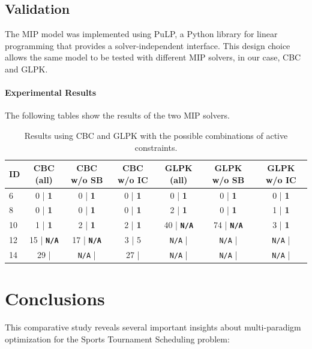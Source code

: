 \documentclass[11pt]{article}
\begin{document}
\subsection{Validation}

The MIP model was implemented using PuLP, a Python library for linear programming that provides a solver-independent interface. This design choice allows the same model to be tested with different MIP solvers, in our case, CBC and GLPK.

\paragraph{Experimental Results} The following tables show the results of the two MIP solvers.

\begin{table}[H]
\centering
\small
\label{tab:mip}
\begin{tabular}{@{}lcccccc@{}}
\toprule
ID & CBC (all) & CBC w/o SB & CBC w/o IC & GLPK (all) & GLPK w/o SB & GLPK w/o IC \\
\midrule
6 & 0 | \textbf{1} & 0 | \textbf{1} & 0 | \textbf{1} & 0 | \textbf{1} & 0 | \textbf{1} & 0 | \textbf{1}\\
8 & 0 | \textbf{1} & 0 | \textbf{1} & 0 | \textbf{1} & 2 | \textbf{1} & 0 | \textbf{1} & 1 | \textbf{1}\\
10 & 1 | \textbf{1} & 2 | \textbf{1} & 2 | \textbf{1} & 40 | \textbf{\texttt{N/A}} & 74 | \textbf{\texttt{N/A}} & 3 | \textbf{1}\\
12 & 15 | \textbf{\texttt{N/A}} & 17 | \textbf{\texttt{N/A}} & 3 | 5 & \texttt{N/A} |& \texttt{N/A} |& \texttt{N/A} |\\
14 & 29 | & \texttt{N/A} | & 27 | & \texttt{N/A} |& \texttt{N/A} |& \texttt{N/A} |\\
\bottomrule
\end{tabular}
\caption{Results using CBC and GLPK with the possible combinations of active constraints.}
\end{table}

\section{Conclusions}

This comparative study reveals several important insights about multi-paradigm optimization for the Sports Tournament Scheduling problem:
\end{document}
